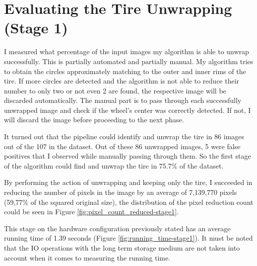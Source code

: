 \section{Evaluating the Tire Unwrapping (Stage 1)}\label{section:evaluation-tire_unwrapping}

I measured what percentage of the input images my algorithm is able to unwrap successfully. This is partially automated and partially manual. My algorithm tries to obtain the circles approximately matching to the outer and inner rims of the tire. If more circles are detected and the algorithm is not able to reduce their number to only two or not even 2 are found, the respective image will be discarded automatically. The manual part is to pass through each successfully unwrapped image and check if the wheel's center was correctly detected. If not, I will discard the image before proceeding to the next phase.

It turned out that the pipeline could identify and unwrap the tire in 86 images out of the 107 in the dataset. Out of these 86 unwrapped images, 5 were false positives that I observed while manually passing through them. So the first stage of the algorithm could find and unwrap the tire in 75.7\% of the dataset.

By performing the action of unwrapping and keeping only the tire, I succeeded in reducing the number of pixels in the image by an average of 7,139,770 pixels (59,77\% of the squared original size), the distribution of the pixel reduction count could be seen in Figure \ref{fig:pixel_count_reduced-stage1}.

This stage on the hardware configuration previously stated has an average running time of 1.39 seconds (Figure \ref{fig:running_time-stage1}). It must be noted that the IO operations with the long term storage medium are not taken into account when it comes to measuring the running time.

